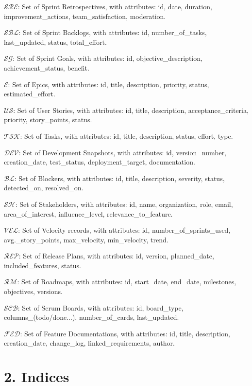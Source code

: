 \documentclass[12pt]{article}
\begin{document}
    \item $ \mathcal{SRE} $: Set of Sprint Retrospectives, with attributes: id, date, duration, improvement\_actions, team\_satisfaction, moderation.
    \item $ \mathcal{SBL} $: Set of Sprint Backlogs, with attributes: id, number\_of\_tasks, last\_updated, status, total\_effort.
    \item $ \mathcal{SG} $: Set of Sprint Goals, with attributes: id, objective\_description, achievement\_status, benefit.
    \item $ \mathcal{E} $: Set of Epics, with attributes: id, title, description, priority, status, estimated\_effort.
    \item $ \mathcal{US} $: Set of User Stories, with attributes: id, title, description, acceptance\_criteria, priority, story\_points, status.
    \item $ \mathcal{TSK} $: Set of Tasks, with attributes: id, title, description, status, effort, type.
    \item $ \mathcal{DEV} $: Set of Development Snapshots, with attributes: id, version\_number, creation\_date, test\_status, deployment\_target, documentation.
    \item $ \mathcal{BL} $: Set of Blockers, with attributes: id, title, description, severity, status, detected\_on, resolved\_on.
    \item $ \mathcal{SH} $: Set of Stakeholders, with attributes: id, name, organization, role, email, area\_of\_interest, influence\_level, relevance\_to\_feature.
    \item $ \mathcal{VEL} $: Set of Velocity records, with attributes: id, number\_of\_sprints\_used, avg.\_story\_points, max\_velocity, min\_velocity, trend.
    \item $ \mathcal{REP} $: Set of Release Plans, with attributes: id, version, planned\_date, included\_features, status.
    \item $ \mathcal{RM} $: Set of Roadmaps, with attributes: id, start\_date, end\_date, milestones, objectives, versions.
    \item $ \mathcal{SCB} $: Set of Scrum Boards, with attributes: id, board\_type, columns\_(todo/done...), number\_of\_cards, last\_updated.
    \item $ \mathcal{FED} $: Set of Feature Documentations, with attributes: id, title, description, creation\_date, change\_log, linked\_requirements, author.

\section{2. Indices}
\end{document}
